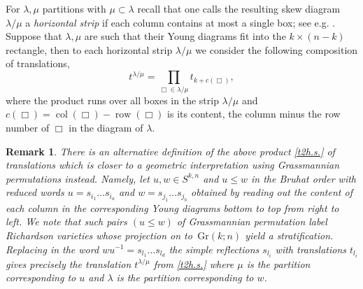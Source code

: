 \documentclass[12pt]{amsart}
\newcommand{\Gr}{\,\mathrm{Gr}}
\newcommand{\op}[1]{\operatorname{#1}}
\newtheorem{remark}{Remark}[section]
\numberwithin{equation}{section}
\numberwithin{figure}{section}
\begin{document}
For $\lambda,\mu$ partitions with $\mu\subset\lambda$ recall that one calls the resulting skew diagram $\lambda/\mu$ a {\em horizontal strip} if each column contains at most a single box; see e.g. \cite[Chapter I]{macdonald1998symmetric}. Suppose that $\lambda,\mu$ are such that their Young diagrams fit into the $k\times(n-k)$ rectangle, then to each horizontal strip $\lambda/\mu$ we consider the following composition of translations,
\begin{equation}\label{t2h.s.}
t^{\lambda/\mu} = \prod\limits_{\Box \in \lambda/\mu} t_{k + c(\Box)},
\end{equation}
where the product runs over all boxes in the strip $\lambda/\mu$ and $c(\Box)=\op{col}(\Box)-\op{row}(\Box)$ is its content, the column minus the row number of $\Box$ in the diagram of $\lambda$.
\begin{remark}\label{rmk:Richardson}
\rm
    There is an alternative definition of the above product \eqref{t2h.s.} of translations which is closer to a geometric interpretation using Grassmannian permutations instead. Namely, let $u,w\in S^{k,n}$ and $u\le w$ in the Bruhat order with reduced words $u=s_{i_1}\ldots s_{i_a}$ and $w=s_{j_1}\ldots s_{j_b}$ obtained by reading out the content of each column in the corresponding Young diagrams bottom to top from right to left. We note that such pairs $(u\le w)$ of Grassmannian permutation label Richardson varieties whose projection on to $\Gr(k;n)$ yield a stratification. Replacing in the word $wu^{-1}=s_{l_1}\ldots s_{l_d}$ the simple reflections $s_{l_i}$ with translations $t_{l_i}$ gives precisely the translation $t^{\lambda/\mu}$ from \eqref{t2h.s.} where $\mu$ is the partition corresponding to $u$ and $\lambda$ is the partition corresponding to $w$. 
\end{remark}
\end{document}
